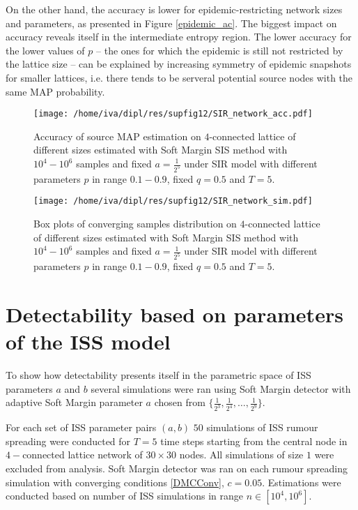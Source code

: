 \documentclass[times, utf8, diplomski]{fer}
\begin{document}
On the other hand, the accuracy is lower for epidemic-restricting network sizes and parameters, as presented in Figure \ref{epidemic_ac}. The biggest impact on accuracy reveals itself in the intermediate entropy region. The lower accuracy for the lower values of $p$ -- the ones  for which the epidemic is still not restricted by the lattice size -- can be explained by increasing symmetry of epidemic snapshots for smaller lattices, i.e. there tends to be serveral potential source nodes with the same MAP probability.

\begin{figure}
\begin{minipage}{\textwidth}
\center
\texttt{[image: /home/iva/dipl/res/supfig12/SIR\_network\_acc.pdf]}
\caption{Accuracy of source MAP estimation  on  $4$-connected lattice of different sizes estimated with Soft Margin SIS method with $10^4 - 10^6$ samples and fixed $a=\frac{1}{2^5}$ under SIR model with different parameters $p$ in range $0.1 - 0.9$, fixed $q = 0.5$ and $T = 5$. }
\label{epidemic_ac}
\end{minipage}
\begin{minipage}{\textwidth}
\center
\texttt{[image: /home/iva/dipl/res/supfig12/SIR\_network\_sim.pdf]}
\caption{Box plots of converging samples distribution on  $4$-connected lattice of different sizes estimated with Soft Margin SIS method with $10^4 - 10^6$ samples and fixed $a=\frac{1}{2^5}$ under SIR model with different parameters $p$ in range $0.1 - 0.9$, fixed $q = 0.5$ and $T = 5$.}
\label{epidemic_sim}
\end{minipage}
\end{figure}

\section{Detectability based on parameters of the ISS model}

To show how detectability presents itself in the parametric space of ISS parameters $a$ and $b$ several simulations were ran using Soft Margin detector with adaptive Soft Margin parameter $a$ chosen from $\{\frac{1}{2^3}, \frac{1}{2^4}, \ldots, \frac{1}{2^9} \}$.

For each set of ISS parameter pairs $(a, b)$  $50$ simulations of ISS rumour spreading were conducted for $T = 5$ time steps starting from the central node in $4-$connected lattice network of $30 \times 30$ nodes. All simulations of size $1$ were excluded from analysis. Soft Margin detector was ran on each rumour spreading simulation with converging conditions \ref{DMCConv}, $c=0.05$. Estimations were conducted based on  number of ISS simulations in range $n \in [10^4, 10^6]$. 
\end{document}
